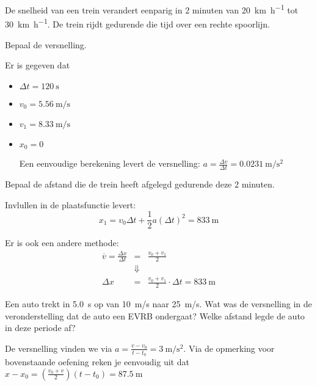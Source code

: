 \documentclass{ximera}
\begin{document}
\begin{exercise}
    De snelheid van een trein verandert eenparig in 2 minuten van \SI{20}{\kilo\meter\per\hour} tot \SI{30}{\kilo\meter\per\hour}. De trein rijdt gedurende die tijd over een rechte spoorlijn.
    \begin{question} Bepaal de versnelling.   
    \begin{oplossing}
    Er is gegeven dat 
    \begin{itemize}
        \item \(\Delta t = \SI{120}{\second}\)
        \item \(v_0 = \SI{5, 56}{\meter\per\second}\)
        \item \(v_1 = \SI{8,33}{\meter\per\second}\)
        \item \(x_0 = 0\)
    
        Een eenvoudige berekening levert de versnelling: \(a = \frac{\Delta v}{\Delta t} = \SI{0,0231}{\meter\per\second\squared}\)
    \end{itemize}
    \end{oplossing} 
    \end{question}
    \begin{question} Bepaal de afstand die de trein heeft afgelegd gedurende deze 2 minuten. 
    \begin{oplossing}
    Invlullen in de plaatsfunctie levert: 
    \[
    x_1 = v_0 \Delta t + \frac{1}{2}a (\Delta t)^2 = \SI{833}{\meter}
    \]

    \begin{remark}
        Er is ook een andere methode: 
        \[
        \begin{array}{rcl}
            \overline{v} = \frac{\Delta x}{\Delta t} &=& \frac{v_0 + v_1}{2}\\ 
            &\Downarrow&\\
            \Delta x &=& \frac{v_0 + v_1}{2} \cdot \Delta t = \SI{833}{\meter}
            
        \end{array}
        \]
    \end{remark}
    \end{oplossing} 
    \end{question}
\end{exercise}

\begin{exercise}
    Een auto trekt in \SI{5,0}{s} op van \SI{10}{m/s} naar \SI{25}{m/s}. Wat was de versnelling in de veronderstelling dat de auto een EVRB ondergaat? Welke afstand legde de auto in deze periode af?
    \begin{oplossing}
        De versnelling vinden we via $a=\frac{v-v_0}{t-t_0}=\SI{3}{\meter\per\second\squared}$. Via de opmerking voor bovenstaande oefening reken je eenvoudig uit dat $x-x_0=\left(\frac{v_0+v}{2}\right)(t-t_0)=\SI{87.5}{\meter}$
    \end{oplossing}
\end{exercise}
\end{document}
